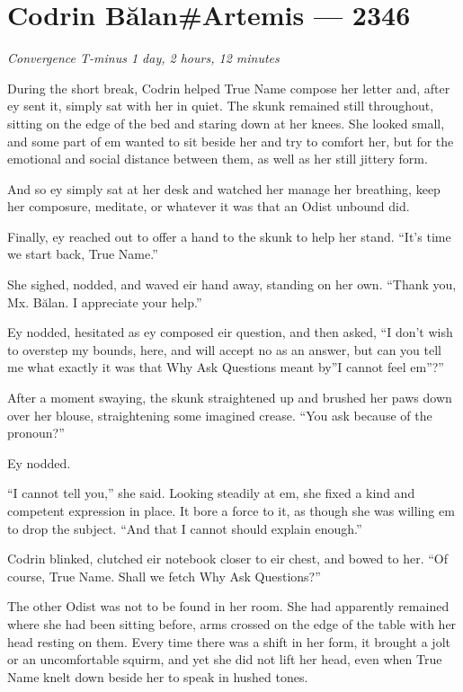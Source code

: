 \hypertarget{codrin-bux103lanartemis-2346}{%
\chapter{Codrin Bălan\#Artemis — 2346}\label{codrin-bux103lanartemis-2346}}

\begin{center}
\emph{Convergence T-minus 1 day, 2 hours, 12 minutes}
\end{center}

\noindent During the short break, Codrin helped True Name compose her letter and, after ey sent it, simply sat with her in quiet. The skunk remained still throughout, sitting on the edge of the bed and staring down at her knees. She looked small, and some part of em wanted to sit beside her and try to comfort her, but for the emotional and social distance between them, as well as her still jittery form.

And so ey simply sat at her desk and watched her manage her breathing, keep her composure, meditate, or whatever it was that an Odist unbound did.

Finally, ey reached out to offer a hand to the skunk to help her stand. ``It's time we start back, True Name.''

She sighed, nodded, and waved eir hand away, standing on her own. ``Thank you, Mx. Bălan. I appreciate your help.''

Ey nodded, hesitated as ey composed eir question, and then asked, ``I don't wish to overstep my bounds, here, and will accept no as an answer, but can you tell me what exactly it was that Why Ask Questions meant by''I cannot feel em''?''

After a moment swaying, the skunk straightened up and brushed her paws down over her blouse, straightening some imagined crease. ``You ask because of the pronoun?''

Ey nodded.

``I cannot tell you,'' she said. Looking steadily at em, she fixed a kind and competent expression in place. It bore a force to it, as though she was willing em to drop the subject. ``And that I cannot should explain enough.''

Codrin blinked, clutched eir notebook closer to eir chest, and bowed to her. ``Of course, True Name. Shall we fetch Why Ask Questions?''

The other Odist was not to be found in her room. She had apparently remained where she had been sitting before, arms crossed on the edge of the table with her head resting on them. Every time there was a shift in her form, it brought a jolt or an uncomfortable squirm, and yet she did not lift her head, even when True Name knelt down beside her to speak in hushed tones.

